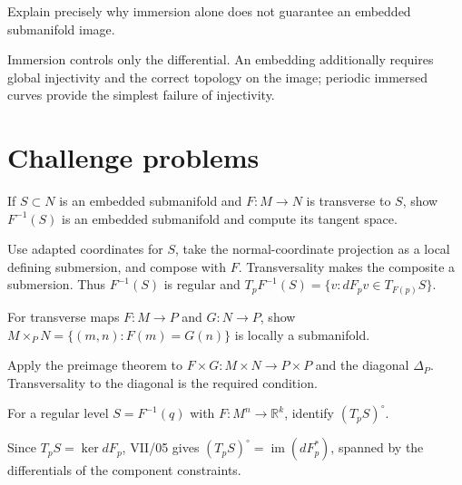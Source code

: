 \begin{problem}\label{prob:vii06-12}
Explain precisely why immersion alone does not guarantee an embedded submanifold image.
\end{problem}
\begin{solution}
Immersion controls only the differential. An embedding additionally requires global injectivity and the correct topology on the image; periodic immersed curves provide the simplest failure of injectivity.
\end{solution}

\section{Challenge problems}
\begin{problem}\label{prob:vii06-ch01}
If \(S\subset N\) is an embedded submanifold and \(F:M\to N\) is transverse to \(S\), show \(F^{-1}(S)\) is an embedded submanifold and compute its tangent space.
\end{problem}
\begin{solution}
Use adapted coordinates for \(S\), take the normal-coordinate projection as a local defining submersion, and compose with \(F\). Transversality makes the composite a submersion. Thus \(F^{-1}(S)\) is regular and \(T_pF^{-1}(S)=\{v:dF_pv\in T_{F(p)}S\}\).
\end{solution}

\begin{problem}\label{prob:vii06-ch02}
For transverse maps \(F:M\to P\) and \(G:N\to P\), show \(M\times_PN=\{(m,n):F(m)=G(n)\}\) is locally a submanifold.
\end{problem}
\begin{solution}
Apply the preimage theorem to \(F\times G:M\times N\to P\times P\) and the diagonal \(\Delta_P\). Transversality to the diagonal is the required condition.
\end{solution}

\begin{problem}\label{prob:vii06-ch03}
For a regular level \(S=F^{-1}(q)\) with \(F:M^n\to\mathbb R^k\), identify \((T_pS)^\circ\).
\end{problem}
\begin{solution}
Since \(T_pS=\ker dF_p\), VII/05 gives \((T_pS)^\circ=\operatorname{im}(dF_p^*)\), spanned by the differentials of the component constraints.
\end{solution}

